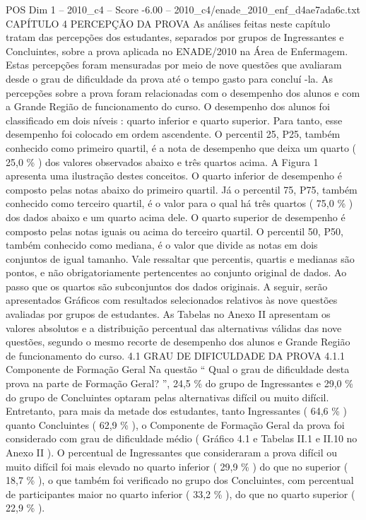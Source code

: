 \begin{textsample}{POS Dim 1 – 2010\_c4 – Score -6.00 – 2010\_c4/enade\_2010\_enf\_d4ae7ada6c.txt}  \label{ex:f1_pos_404}
CAPÍTULO 4 PERCEPÇÃO DA PROVA As análises feitas neste capítulo tratam das percepções dos estudantes, separados por grupos de Ingressantes e Concluintes, sobre a prova aplicada no ENADE/2010 na Área de Enfermagem.
Estas percepções foram mensuradas por meio de nove questões que avaliaram desde o grau de dificuldade da prova até o tempo gasto para concluí -la.
As percepções sobre a prova foram relacionadas com o desempenho dos alunos e com a Grande Região de funcionamento do curso.
O desempenho dos alunos foi classificado em dois níveis : quarto inferior e quarto superior.
Para tanto, esse desempenho foi colocado em ordem ascendente.
O percentil 25, P25, também conhecido como primeiro quartil, é a nota de desempenho que deixa um quarto ( 25,0 \% ) dos valores observados abaixo e três quartos acima.
A Figura 1 apresenta uma ilustração destes conceitos.
O quarto inferior de desempenho é composto pelas notas abaixo do primeiro quartil.
Já o percentil 75, P75, também conhecido como terceiro quartil, é o valor para o qual há três quartos ( 75,0 \% ) dos dados abaixo e um quarto acima dele.
O quarto superior de desempenho é composto pelas notas iguais ou acima do terceiro quartil.
O percentil 50, P50, também conhecido como mediana, é o valor que divide as notas em dois conjuntos de igual tamanho.
Vale ressaltar que percentis, quartis e medianas são pontos, e não obrigatoriamente pertencentes ao conjunto original de dados.
Ao passo que os quartos são subconjuntos dos dados originais.
A seguir, serão apresentados Gráficos com resultados selecionados relativos às nove questões avaliadas por grupos de estudantes.
As Tabelas no Anexo II apresentam os valores absolutos e a distribuição percentual das alternativas válidas das nove questões, segundo o mesmo recorte de desempenho dos alunos e Grande Região de funcionamento do curso. 4.1 GRAU DE DIFICULDADE DA PROVA 4.1.1 Componente de Formação Geral Na questão “ Qual o grau de dificuldade desta prova na parte de Formação Geral? ”, 24,5 \% do grupo de Ingressantes e 29,0 \% do grupo de Concluintes optaram pelas alternativas difícil ou muito difícil.
Entretanto, para mais da metade dos estudantes, tanto Ingressantes ( 64,6 \% ) quanto Concluintes ( 62,9 \% ), o Componente de Formação Geral da prova foi considerado com grau de dificuldade médio ( Gráfico 4.1 e Tabelas II.1 e II.10 no Anexo II ).
O percentual de Ingressantes que consideraram a prova difícil ou muito difícil foi mais elevado no quarto inferior ( 29,9 \% ) do que no superior ( 18,7 \% ), o que também foi verificado no grupo dos Concluintes, com percentual de participantes maior no quarto inferior ( 33,2 \% ), do que no quarto superior ( 22,9 \% ).

\end{textsample}
